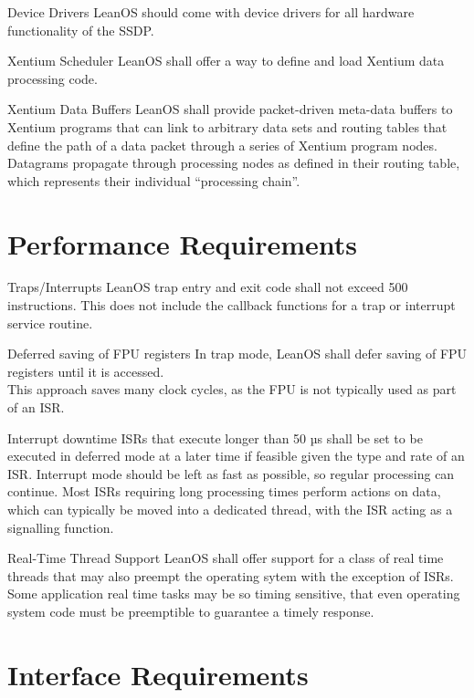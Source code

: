  {Device Drivers}{%
LeanOS should come with device drivers for all hardware functionality of the SSDP.
}{}%

 {Xentium Scheduler}{%
LeanOS shall offer a way to define and load Xentium data processing code.
}{}%

 {Xentium Data Buffers}{%
LeanOS shall provide packet-driven meta-data buffers to Xentium programs that
can link to arbitrary data sets and routing tables that define the path of
a data packet through a series of Xentium program nodes.
}{%
Datagrams propagate through processing nodes as defined in their routing table,
which represents their individual ``processing chain''.}%


\section{Performance Requirements}

 {Traps/Interrupts}{%
LeanOS trap entry and exit code shall not exceed 500 instructions.
}{%
This does not include the callback functions for a trap or interrupt
service routine.
}%

 {Deferred saving of \gls{FPU} registers}{%
In trap mode, LeanOS shall defer saving of \gls{FPU} registers until it is
accessed.\\


}{%
This approach saves many clock cycles, as the \gls{FPU} is not typically used
as part of an \gls{ISR}.
}%


 {Interrupt downtime}{%
\glspl{ISR} that execute longer than 50 µs shall be set to be executed in
deferred mode at a later time if feasible given the type and rate of an \gls{ISR}.
}{
Interrupt mode should be left as fast as possible, so regular processing can
continue. Most \glspl{ISR} requiring long processing times perform actions on
data, which can typically be moved into a dedicated thread, with the \gls{ISR}
acting as a signalling function.
}%

 {Real-Time Thread Support}{%
LeanOS shall offer support for a class of real time threads that may also
preempt the operating sytem with the exception of \glspl{ISR}.
}{%
Some application real time tasks may be so timing sensitive, that even
operating system code must be preemptible to guarantee a timely response.
}%

\section{Interface Requirements}

